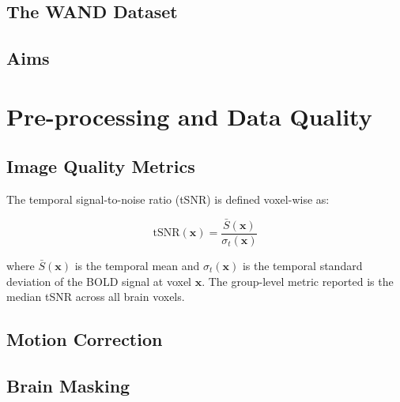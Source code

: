 \documentclass[11pt, a4paper]{article}
\begin{document}
\subsection{The WAND Dataset}

\subsection{Aims}

\section{Pre-processing and Data Quality}
\label{sec:preprocessing}

%

\subsection{Image Quality Metrics}

The temporal signal-to-noise ratio (tSNR) is defined voxel-wise as:

\begin{equation}
    \text{tSNR}(\mathbf{x}) = \frac{\bar{S}(\mathbf{x})}{\sigma_t(\mathbf{x})}
    \label{eq:tsnr}
\end{equation}

where $\bar{S}(\mathbf{x})$ is the temporal mean and $\sigma_t(\mathbf{x})$ is
the temporal standard deviation of the BOLD signal at voxel $\mathbf{x}$.
The group-level metric reported is the median tSNR across all brain voxels.

\subsection{Motion Correction}

\subsection{Brain Masking}
\end{document}
